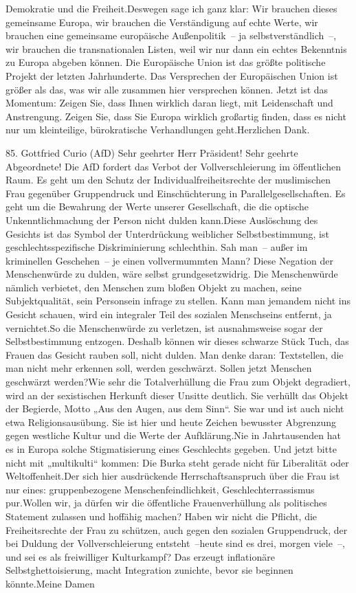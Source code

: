 \documentclass{article}
\begin{document}
Demokratie und die Freiheit.Deswegen sage ich ganz klar: Wir brauchen dieses gemeinsame Europa, wir brauchen die Verständigung auf echte Werte, wir brauchen eine gemeinsame europäische Außenpolitik – ja selbstverständlich –, wir brauchen die transnationalen Listen, weil wir nur dann ein echtes Bekenntnis zu Europa abgeben können. Die Europäische Union ist das größte politische Projekt der letzten Jahrhunderte. Das Versprechen der Europäischen Union ist größer als das, was wir alle zusammen hier versprechen können. Jetzt ist das Momentum: Zeigen Sie, dass Ihnen wirklich daran liegt, mit Leidenschaft und Anstrengung. Zeigen Sie, dass Sie Europa wirklich großartig finden, dass es nicht nur um kleinteilige, bürokratische Verhandlungen geht.Herzlichen Dank.




	85. Gottfried Curio (AfD) Sehr geehrter Herr Präsident! Sehr geehrte Abgeordnete! Die AfD fordert das Verbot der Vollverschleierung im öffentlichen Raum. Es geht um den Schutz der Individualfreiheitsrechte der muslimischen Frau gegenüber Gruppendruck und Einschüchterung in Parallelgesellschaften. Es geht um die Bewahrung der Werte unserer Gesellschaft, die die optische Unkenntlichmachung der Person nicht dulden kann.Diese Auslöschung des Gesichts ist das Symbol der Unterdrückung weiblicher Selbstbestimmung, ist geschlechtsspezifische Diskriminierung schlechthin. Sah man – außer im kriminellen Geschehen – je einen vollvermummten Mann? Diese Negation der Menschenwürde zu dulden, wäre selbst grundgesetzwidrig. Die Menschenwürde nämlich verbietet, den Menschen zum bloßen Objekt zu machen, seine Subjektqualität, sein Personsein infrage zu stellen. Kann man jemandem nicht ins Gesicht schauen, wird ein integraler Teil des sozialen Menschseins entfernt, ja vernichtet.So die Menschenwürde zu verletzen, ist ausnahmsweise sogar der Selbstbestimmung entzogen. Deshalb können wir dieses schwarze Stück Tuch, das Frauen das Gesicht rauben soll, nicht dulden. Man denke daran: Textstellen, die man nicht mehr erkennen soll, werden geschwärzt. Sollen jetzt Menschen geschwärzt werden?Wie sehr die Totalverhüllung die Frau zum Objekt degradiert, wird an der sexistischen Herkunft dieser Unsitte deutlich. Sie verhüllt das Objekt der Begierde, Motto „Aus den Augen, aus dem Sinn“. Sie war und ist auch nicht etwa Religionsausübung. Sie ist hier und heute Zeichen bewusster Abgrenzung gegen westliche Kultur und die Werte der Aufklärung.Nie in Jahrtausenden hat es in Europa solche Stigmatisierung eines Geschlechts gegeben. Und jetzt bitte nicht mit „multikulti“ kommen: Die Burka steht gerade nicht für Liberalität oder Weltoffenheit.Der sich hier ausdrückende Herrschaftsanspruch über die Frau ist nur eines: gruppenbezogene Menschenfeindlichkeit, Geschlechterrassismus pur.Wollen wir, ja dürfen wir die öffentliche Frauenverhüllung als politisches Statement zulassen und hoffähig machen? Haben wir nicht die Pflicht, die Freiheitsrechte der Frau zu schützen, auch gegen den sozialen Gruppendruck, der bei Duldung der Vollverschleierung entsteht –heute sind es drei, morgen viele –, und sei es als freiwilliger Kulturkampf? Das erzeugt inflationäre Selbstghettoisierung, macht Integration zunichte, bevor sie beginnen könnte.Meine Damen 
\end{document}
